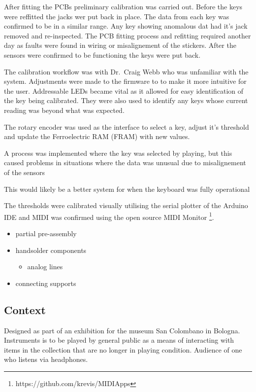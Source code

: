 After fitting the PCBs preliminary calibration was carried out. Before
the keys were reffitted the jacks wer put back in place. The data from
each key was confirmed to be in a similar range. Any key showing
anomalous dat had it's jack removed and re-inspected. The PCB fitting
process and refitting required another day as faults were found in
wiring or misalignement of the stickers. After the sensors were
confirmed to be functioning the keys were put back.

The calibration workflow was with Dr.~Craig Webb who was unfamiliar with
the system. Adjustments were made to the firmware to to make it more
intuitive for the user. Addressable LEDs became vital as it allowed for
easy identification of the key being calibrated. They were also used to
identify any keys whose current reading was beyond what was expected.

The rotary encoder was used as the interface to select a key, adjust
it's threshold and update the Ferroelectric RAM (FRAM) with new values.

A process was implemented where the key was selected by playing, but
this caused problems in situations where the data was unusual due to
misalignement of the sensors

This would likely be a better system for when the keyboard was fully
operational

The thresholds were calibrated visually utilising the serial plotter of
the Arduino IDE and MIDI was confirmed using the open source MIDI
Monitor \footnote{https://github.com/krevis/MIDIApps}.

\begin{itemize}
\item
  partial pre-assembly
\item
  handsolder components

  \begin{itemize}
  \item
    analog lines
  \end{itemize}
\item
  connecting supports
\end{itemize}

\subsection{Context}\label{context}

Designed as part of an exhibition for the museum San Colombano in
Bologna. Instruments is to be played by general public as a means of
interacting with items in the collection that are no longer in playing
condition. Audience of one who listens via headphones.

